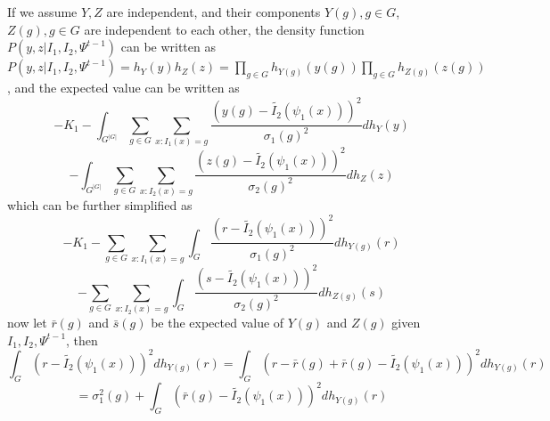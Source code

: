 \documentclass[11pt]{article}
\begin{document}
If we assume $Y, Z$ are independent, and their components $Y(g), g\in G$, $Z(g), g\in G$ are independent to each other, the density function $P(y,z| I_{1}, I_{2}, \Psi^{t-1})$ can be written as $P(y,z| I_{1}, I_{2}, \Psi^{t-1}) = h_{Y}(y)h_{Z}(z) =
\prod_{g\in G}h_{Y(g)}(y(g)) \prod_{g\in G}h_{Z(g)}(z(g))$, and the expected value can be written as
\begin{equation}
-K_{1}-\int_{G^{|G|}}\sum_{g\in G} \sum_{x : I_{1}(x) = g} \frac{\left(y(g) - \tilde{I_{2}}(\psi_{1}(x))\right)^{2}}{\sigma_{1}(g)^{2}}d h_{Y}(y)
\end{equation}
\begin{equation}
-\int_{G^{|G|}}\sum_{g\in G} \sum_{x : I_{2}(x) = g} \frac{\left(z(g) - \tilde{I_{2}}(\psi_{1}(x))\right)^{2}}{\sigma_{2}(g)^{2}}d h_{Z}(z)
\end{equation}
which can be further simplified as
\begin{equation}
-K_{1}-\sum_{g\in G} \sum_{x : I_{1}(x) = g} \int_{G}\frac{\left(r - \tilde{I_{2}}(\psi_{1}(x))\right)^{2}}{\sigma_{1}(g)^{2}}d h_{Y(g)}(r)
\end{equation}
\begin{equation}
-\sum_{g\in G} \sum_{x : I_{2}(x) = g} \int_{G}\frac{\left(s - \tilde{I_{2}}(\psi_{1}(x))\right)^{2}}{\sigma_{2}(g)^{2}}d h_{Z(g)}(s)
\end{equation}
now let $\bar{r}(g)$ and $\bar{s}(g)$ be the expected value of $Y(g)$ and $Z(g)$ given $I_{1}, I_{2}, \Psi^{t-1}$, then
\begin{equation}
\int_{G}\left(r - \tilde{I_{2}}(\psi_{1}(x))\right)^{2}d h_{Y(g)}(r) = \int_{G}\left(r - \bar{r}(g) + \bar{r}(g) - \tilde{I_{2}}(\psi_{1}(x))\right)^{2}d h_{Y(g)}(r)
\end{equation}
\begin{equation}
=\sigma^{2}_{1}(g) + \int_{G}\left(\bar{r}(g) - \tilde{I_{2}}(\psi_{1}(x))\right)^{2}d h_{Y(g)}(r)
\end{equation}


\end{document}
